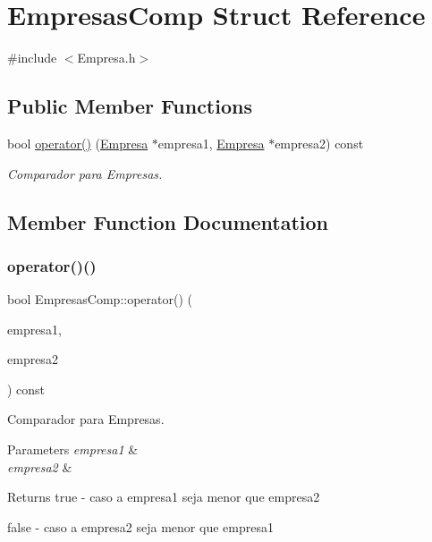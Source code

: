 \hypertarget{structEmpresasComp}{}\section{Empresas\+Comp Struct Reference}
\label{structEmpresasComp}


{\ttfamily \#include $<$Empresa.\+h$>$}

\subsection*{Public Member Functions}
\begin{DoxyCompactItemize}
\item 
bool \hyperlink{structEmpresasComp_a65f437399b6aa939ee84611a69ee0ad0}{operator()} (\hyperlink{classEmpresa}{Empresa} $\ast$empresa1, \hyperlink{classEmpresa}{Empresa} $\ast$empresa2) const
\begin{DoxyCompactList}\small\item\em Comparador para Empresas. \end{DoxyCompactList}\end{DoxyCompactItemize}


\subsection{Member Function Documentation}
\mbox{\label{structEmpresasComp_a65f437399b6aa939ee84611a69ee0ad0}} 
\subsubsection{\texorpdfstring{operator()()}{operator()()}}
{\footnotesize\ttfamily bool Empresas\+Comp\+::operator() (\begin{DoxyParamCaption}\item[{\hyperlink{classEmpresa}{Empresa} $\ast$}]{empresa1,  }\item[{\hyperlink{classEmpresa}{Empresa} $\ast$}]{empresa2 }\end{DoxyParamCaption}) const\hspace{0.3cm}{\ttfamily [inline]}}



Comparador para Empresas. 


\begin{DoxyParams}{Parameters}
{\em empresa1} & \\
\hline
{\em empresa2} & \\
\hline
\end{DoxyParams}
\begin{DoxyReturn}{Returns}
true -\/ caso a empresa1 seja menor que empresa2 

false -\/ caso a empresa2 seja menor que empresa1 
\end{DoxyReturn}

